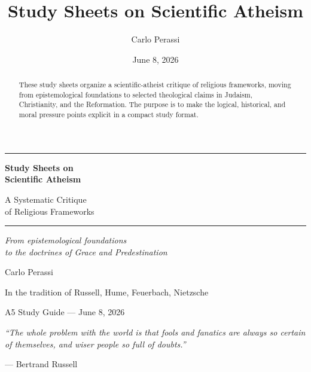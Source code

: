\documentclass[11pt,twoside]{article}
\title{Study Sheets on Scientific Atheism}
\author{Carlo Perassi}
\date{June 8, 2026}
\begin{document}
\begin{titlepage}
\centering
\vspace*{25mm}

{\color{sheetframe}\rule{\textwidth}{1.5pt}}

\vspace{10mm}

{\fontsize{22}{26}\selectfont\bfseries\sffamily\color{sectioncol}
  Study Sheets on\\[4pt]
  Scientific Atheism}

\vspace{8mm}

{\large\sffamily\color{sectioncol!70!black}
  A Systematic Critique\\[2pt]
  of Religious Frameworks}

\vspace{10mm}

{\color{sheetframe}\rule{\textwidth}{1.5pt}}

\vspace{15mm}

{\normalsize\sffamily\textit{%
  From epistemological foundations\\
  to the doctrines of Grace and Predestination}}

\vspace{8mm}

{\large\sffamily Carlo Perassi}

\vspace{10mm}

{\small\sffamily
  In the tradition of Russell, Hume, Feuerbach, Nietzsche}

\vfill

{\small\sffamily\color{gray} A5 Study Guide --- June 8, 2026}
\end{titlepage}

\begin{abstract}
\noindent These study sheets organize a scientific-atheist critique of
religious frameworks, moving from epistemological foundations to selected
theological claims in Judaism, Christianity, and the Reformation. The purpose is
to make the logical, historical, and moral pressure points explicit in a compact
study format.
\end{abstract}

\thispagestyle{empty}
\vspace*{35mm}
\begin{citazione}
\textit{``The whole problem with the world is that fools and fanatics are always
so certain of themselves, and wiser people so full of doubts.''}

\medskip
\hfill--- Bertrand Russell
\end{citazione}
\end{document}
